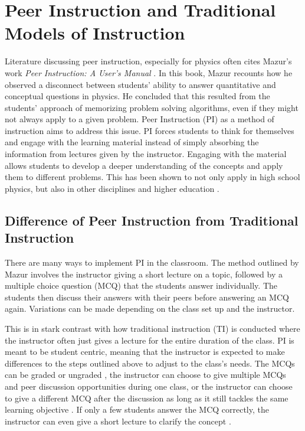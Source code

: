 \documentclass[twocolumn,secnumarabic,amssymb, nobibnotes, aps, prd]{revtex4-2}
\begin{document}
\maketitle
\tableofcontents

\section{Peer Instruction and Traditional Models of Instruction}

    Literature discussing peer instruction, especially for physics often cites Mazur's work \textit{Peer Instruction: A User's Manual} \cite{mazur1997peer,mazur1999}.
    In this book, Mazur recounts how he observed a disconnect between students' ability to answer quantitative and conceptual questions in physics.
    He concluded that this resulted from the students' approach of memorizing problem solving algorithms, even if they might not always apply to a given problem.
    Peer Instruction (PI) as a method of instruction aims to address this issue.
    PI forces students to think for themselves and engage with the learning material instead of simply absorbing the information from lectures given by the instructor.
    Engaging with the material allows students to develop a deeper understanding of the concepts and apply them to different problems.
    This has been shown to not only apply in high school physics, but also in other disciplines and higher education \cite{johnson2008active,fagen2000factors,fagen2002peer}.

    \subsection{Difference of Peer Instruction from Traditional Instruction}

    There are many ways to implement PI in the classroom.
    The method outlined by Mazur \cite{mazur1997peer} involves the instructor giving a short lecture on a topic, followed by a multiple choice question (MCQ) that the students answer individually.
    The students then discuss their answers with their peers before answering an MCQ again.
    Variations can be made depending on the class set up and the instructor.
    
    This is in stark contrast with how traditional instruction (TI) is conducted where the instructor often just gives a lecture for the entire duration of the class.
    PI is meant to be student centric, meaning that the instructor is expected to make differences to the steps outlined above to adjust to the class's needs.
    The MCQs can be graded or ungraded \cite{crouch2001peer}, the instructor can choose to give multiple MCQs and peer discussion opportunities during one class, or the instructor can choose to give a different MCQ after the discussion as long as it still tackles the same learning objective \cite{smith2009peer}.
    If only a few students answer the MCQ correctly, the instructor can even give a short lecture to clarify the concept \cite{lasry2008peer}.
\end{document}
